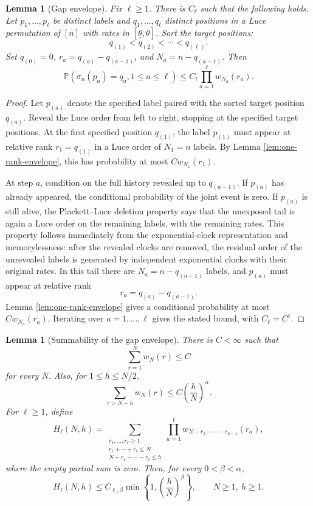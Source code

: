 \documentclass[11pt]{article}
\newtheorem{lemma}[theorem]{Lemma}
\theoremstyle{remark}
\newcommand{\Pp}{\mathbb P}
\begin{document}
\begin{lemma}[Gap envelope]\label{lem:gap-envelope}
Fix \(\ell\ge1\).  There is \(C_\ell\) such that the following holds.  Let \(p_1,\ldots,p_\ell\) be distinct labels and \(q_1,\ldots,q_\ell\) distinct positions in a Luce permutation of \([n]\) with rates in \([\underline\theta,\overline\theta]\).  Sort the target positions:
\[
        q_{(1)}<q_{(2)}<\cdots<q_{(\ell)}.
\]
Set \(q_{(0)}=0\), \(r_a=q_{(a)}-q_{(a-1)}\), and \(N_a=n-q_{(a-1)}\).  Then
\[
        \Pp(\sigma_n(p_a)=q_a,1\le a\le\ell)
        \le C_\ell\prod_{a=1}^\ell w_{N_a}(r_a).
\]
\end{lemma}


\begin{proof}
Let \(p_{(a)}\) denote the specified label paired with the sorted target position \(q_{(a)}\).  Reveal the Luce order from left to right, stopping at the specified target positions.  At the first specified position \(q_{(1)}\), the label \(p_{(1)}\) must appear at relative rank \(r_1=q_{(1)}\) in a Luce order of \(N_1=n\) labels.  By Lemma \ref{lem:one-rank-envelope}, this has probability at most \(Cw_{N_1}(r_1)\).

At step \(a\), condition on the full history revealed up to \(q_{(a-1)}\).  If \(p_{(a)}\) has already appeared, the conditional probability of the joint event is zero.  If \(p_{(a)}\) is still alive, the Plackett--Luce deletion property says that the unexposed tail is again a Luce order on the remaining labels, with the remaining rates.  This property follows immediately from the exponential-clock representation and memorylessness: after the revealed clocks are removed, the residual order of the unrevealed labels is generated by independent exponential clocks with their original rates.  In this tail there are \(N_a=n-q_{(a-1)}\) labels, and \(p_{(a)}\) must appear at relative rank
\[
        r_a=q_{(a)}-q_{(a-1)}.
\]
Lemma \ref{lem:one-rank-envelope} gives a conditional probability at most \(Cw_{N_a}(r_a)\).  Iterating over \(a=1,\ldots,\ell\) gives the stated bound, with \(C_\ell=C^\ell\).
\end{proof}

\begin{lemma}[Summability of the gap envelope]\label{lem:gap-sum}
There is $C<\infty$ such that
\[
        \sum_{r=1}^{N}w_N(r)\le C
\]
for every $N$.  Also, for $1\le h\le N/2$,
\[
        \sum_{r>N-h}w_N(r)\le C\left(\frac hN\right)^\alpha.
\]
For $\ell\ge1$, define
\[
H_\ell(N,h)=
\sum_{\substack{r_1,\ldots,r_\ell\ge1\\
 r_1+\cdots+r_\ell\le N\\
 N-r_1-\cdots-r_\ell\le h}}
\prod_{a=1}^\ell
w_{N-r_1-\cdots-r_{a-1}}(r_a),
\]
where the empty partial sum is zero.  Then, for every $0<\beta<\alpha$,
\[
        H_\ell(N,h)\le C_{\ell,\beta}
        \min\left\{1,\left(\frac hN\right)^\beta\right\},
        \qquad N\ge1,\ h\ge1.
\]
\end{lemma}
\end{document}
